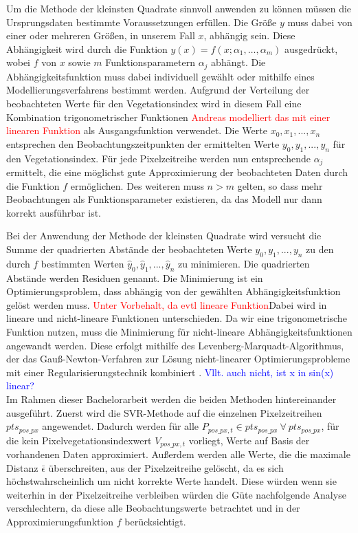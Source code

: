 Um die Methode der kleinsten Quadrate sinnvoll anwenden zu können müssen die Ursprungsdaten bestimmte Voraussetzungen erfüllen. Die Größe \(y\) muss dabei von einer oder mehreren Größen, in unserem Fall \(x\), abhängig sein. Diese Abhängigkeit wird durch die Funktion \(y(x) = f(x;\alpha_1,\dots,\alpha_m)\) ausgedrückt, wobei \(f\) von \(x\) sowie \(m\) Funktionsparametern \(\alpha_j\) abhängt. Die Abhängigkeitsfunktion muss dabei individuell gewählt oder mithilfe eines Modellierungsverfahrens bestimmt werden. Aufgrund der Verteilung der beobachteten Werte für den Vegetationsindex wird in diesem Fall eine Kombination trigonometrischer Funktionen \textcolor{red}{Andreas modelliert das mit einer linearen Funktion} als Ausgangsfunktion verwendet. Die Werte \(x_0, x_1,...,x_n\) entsprechen den Beobachtungszeitpunkten der ermittelten Werte \(y_0, y_1,...,y_n\) für den Vegetationsindex. Für jede Pixelzeitreihe werden nun entsprechende \(\alpha_j\) ermittelt, die eine möglichst gute Approximierung der beobachteten Daten durch die Funktion \(f\) ermöglichen. Des weiteren muss \(n > m\) gelten, so dass mehr Beobachtungen als Funktionsparameter existieren, da das Modell nur dann korrekt ausführbar ist.

Bei der Anwendung der Methode der kleinsten Quadrate wird versucht die Summe der quadrierten Abstände der beobachteten Werte \(y_0, y_1,...,y_n\) zu den durch \(f\) bestimmten Werten \(\hat{y}_0, \hat{y}_1,...,\hat{y}_n\) zu minimieren. Die quadrierten Abstände werden Residuen genannt. Die Minimierung ist ein Optimierungsproblem, dass abhängig von der gewählten Abhängigkeitsfunktion gelöst werden muss. \textcolor{red}{Unter Vorbehalt, da evtl lineare Funktion}Dabei wird in lineare und nicht-lineare Funktionen unterschieden. Da wir eine trigonometrische Funktion nutzen, muss die Minimierung für nicht-lineare Abhängigkeitsfunktionen angewandt werden. Diese erfolgt mithilfe des Levenberg-Marquadt-Algorithmus, der das Gauß-Newton-Verfahren zur Lösung nicht-linearer Optimierungsprobleme mit einer Regularisierungstechnik kombiniert \cite{Levenberg1978}. \textcolor{blue}{Vllt. auch nicht, ist x in sin(x) linear?} \\

Im Rahmen dieser Bachelorarbeit werden die beiden Methoden hintereinander ausgeführt. Zuerst wird die SVR-Methode auf die einzelnen Pixelzeitreihen $pts_{pos\_px}$ angewendet. Dadurch werden für alle $P_{pos\_px, t} \in pts_{pos\_px}\ \forall\ pts_{pos\_px}$, für die kein Pixelvegetationsindexwert $V_{pos\_px, t}$ vorliegt, Werte auf Basis der vorhandenen Daten approximiert. Außerdem werden alle Werte, die die maximale Distanz $\bar{\epsilon}$ überschreiten, aus der Pixelzeitreihe gelöscht, da es sich höchstwahrscheinlich um nicht korrekte Werte handelt. Diese würden wenn sie weiterhin in der Pixelzeitreihe verbleiben würden die Güte nachfolgende Analyse verschlechtern, da diese alle Beobachtungswerte betrachtet und in der Approximierungsfunktion $f$ berücksichtigt.


